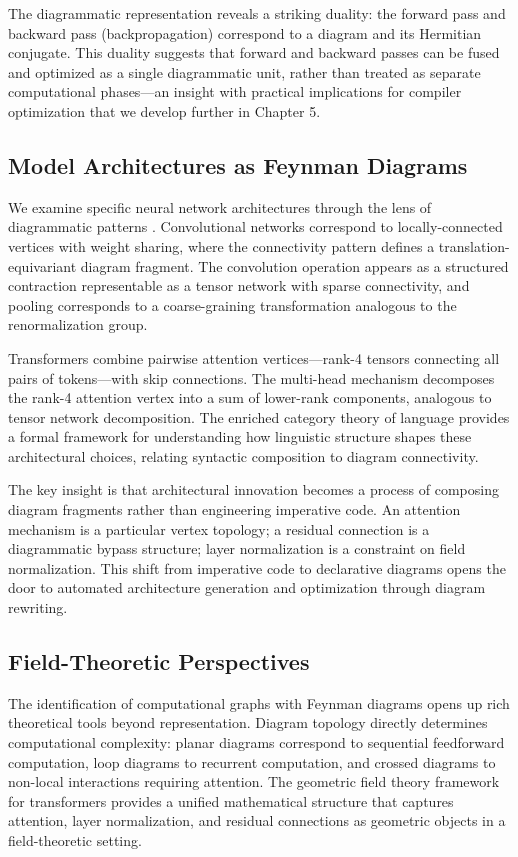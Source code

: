 \documentclass[12pt,a4paper]{article}
\begin{document}
The diagrammatic representation reveals a striking duality: the forward pass and backward pass (backpropagation) correspond to a diagram and its Hermitian conjugate. This duality suggests that forward and backward passes can be fused and optimized as a single diagrammatic unit, rather than treated as separate computational phases---an insight with practical implications for compiler optimization that we develop further in Chapter 5.

\subsection{Model Architectures as Feynman Diagrams}

We examine specific neural network architectures through the lens of diagrammatic patterns \cite{abbott2024neural}. Convolutional networks correspond to locally-connected vertices with weight sharing, where the connectivity pattern defines a translation-equivariant diagram fragment. The convolution operation appears as a structured contraction representable as a tensor network with sparse connectivity, and pooling corresponds to a coarse-graining transformation analogous to the renormalization group.

Transformers combine pairwise attention vertices---rank-4 tensors connecting all pairs of tokens---with skip connections. The multi-head mechanism decomposes the rank-4 attention vertex into a sum of lower-rank components, analogous to tensor network decomposition. The enriched category theory of language \cite{bradley2022an} provides a formal framework for understanding how linguistic structure shapes these architectural choices, relating syntactic composition to diagram connectivity.

The key insight is that architectural innovation becomes a process of composing diagram fragments rather than engineering imperative code. An attention mechanism is a particular vertex topology; a residual connection is a diagrammatic bypass structure; layer normalization is a constraint on field normalization. This shift from imperative code to declarative diagrams opens the door to automated architecture generation and optimization through diagram rewriting.

\subsection{Field-Theoretic Perspectives}

The identification of computational graphs with Feynman diagrams opens up rich theoretical tools beyond representation. Diagram topology directly determines computational complexity: planar diagrams correspond to sequential feedforward computation, loop diagrams to recurrent computation, and crossed diagrams to non-local interactions requiring attention. The geometric field theory framework for transformers \cite{unified2025a} provides a unified mathematical structure that captures attention, layer normalization, and residual connections as geometric objects in a field-theoretic setting.
\end{document}
